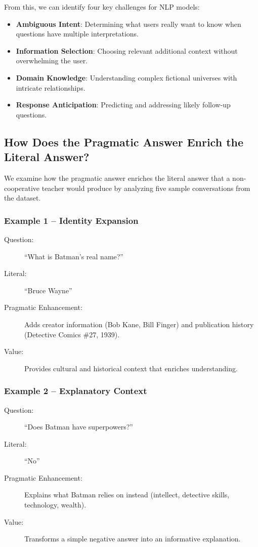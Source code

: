 \documentclass[12pt, letterpaper]{article}
\begin{document}
From this, we can identify four key challenges for NLP models:
\begin{itemize}
    \item \textbf{Ambiguous Intent}: Determining what users really want to know when questions have multiple interpretations.
    \item \textbf{Information Selection}: Choosing relevant additional context without overwhelming the user.
    \item \textbf{Domain Knowledge}: Understanding complex fictional universes with intricate relationships.
    \item \textbf{Response Anticipation}: Predicting and addressing likely follow-up questions.
\end{itemize}

\subsection*{How Does the Pragmatic Answer Enrich the Literal Answer?}
We examine how the pragmatic answer enriches the literal answer that a non-cooperative teacher would produce by analyzing five sample conversations from the dataset.

\subsubsection*{Example 1 -- Identity Expansion}
\begin{description}
    \item[Question:] ``What is Batman's real name?''
    \item[Literal:] ``Bruce Wayne''
    \item[Pragmatic Enhancement:] Adds creator information (Bob Kane, Bill Finger) and publication history (Detective Comics \#27, 1939).
    \item[Value:] Provides cultural and historical context that enriches understanding.
\end{description}

\subsubsection*{Example 2 -- Explanatory Context}
\begin{description}
    \item[Question:] ``Does Batman have superpowers?''
    \item[Literal:] ``No''
    \item[Pragmatic Enhancement:] Explains what Batman relies on instead (intellect, detective skills, technology, wealth).
    \item[Value:] Transforms a simple negative answer into an informative explanation.
\end{description}
\end{document}
